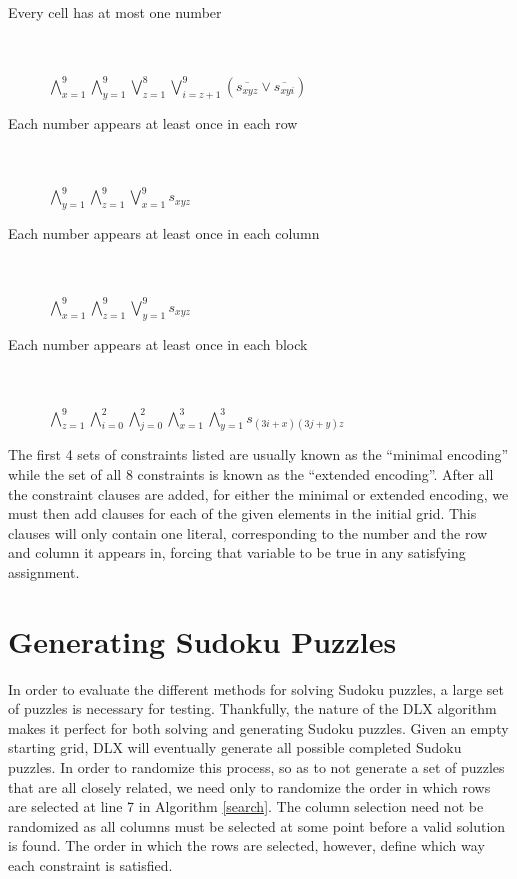 \documentclass[12pt]{article}
\newcounter{row}
\newcounter{col}
\begin{document}
\begin{description}
\item[Every cell has at most one number] \hfill \\ \\
$\bigwedge\limits_{x=1}^{9} \bigwedge\limits_{y=1}^{9} \bigvee\limits_{z=1}^{8} \bigvee\limits_{i=z+1}^{9} (\overline{s_{xyz}} \vee \overline{s_{xyi}})$
\item[Each number appears at least once in each row] \hfill \\ \\
$\bigwedge\limits_{y=1}^{9} \bigwedge\limits_{z=1}^{9} \bigvee\limits_{x=1}^{9}   s_{xyz}$
\item[Each number appears at least once in each column] \hfill \\ \\
$\bigwedge\limits_{x=1}^{9} \bigwedge\limits_{z=1}^{9} \bigvee\limits_{y=1}^{9} s_{xyz}$
\item[Each number appears at least once in each block] \hfill \\ \\
$\bigwedge\limits_{z=1}^{9} \bigwedge\limits_{i=0}^{2} \bigwedge\limits_{j=0}^{2} \bigwedge\limits_{x=1}^{3} \bigwedge\limits_{y=1}^{3} s_{(3i+x)(3j+y)z}$
\end{description}
The first 4 sets of constraints listed are usually known as the ``minimal encoding'' while the set of all 8 constraints is known as the ``extended encoding''. After all the constraint clauses are added, for either the minimal or extended encoding, we must then add clauses for each of the given elements in the initial grid. This clauses will only contain one literal, corresponding to the number and the row and column it appears in, forcing that variable to be true in any satisfying assignment.

\section{Generating Sudoku Puzzles}
In order to evaluate the different methods for solving Sudoku puzzles, a large set of puzzles is necessary for testing. Thankfully, the nature of the DLX algorithm makes it perfect for both solving and generating Sudoku puzzles. Given an empty starting grid, DLX will eventually generate all possible completed Sudoku puzzles. In order to randomize this process, so as to not generate a set of puzzles that are all closely related, we need only to randomize the order in which rows are selected at line 7 in Algorithm \ref{search}. The column selection need not be randomized as all columns must be selected at some point before a valid solution is found. The order in which the rows are selected, however, define which way each constraint is satisfied. \\
\end{document}
